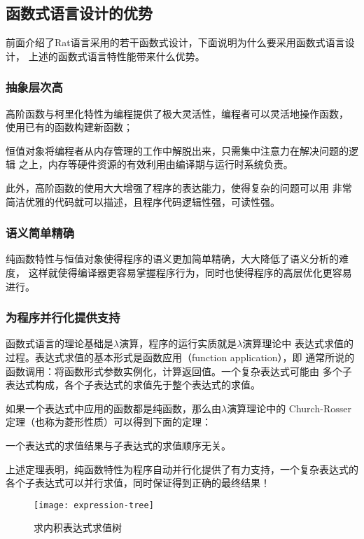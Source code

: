 \subsection{函数式语言设计的优势}\label{subsec:functional-advantages}
前面介绍了Rat语言采用的若干函数式设计，下面说明为什么要采用函数式语言设计，
上述的函数式语言特性能带来什么优势。

\subsubsection{抽象层次高}
高阶函数与柯里化特性为编程提供了极大灵活性，编程者可以灵活地操作函数，
使用已有的函数构建新函数；

恒值对象将编程者从内存管理的工作中解脱出来，只需集中注意力在解决问题的逻辑
之上，内存等硬件资源的有效利用由编译期与运行时系统负责。

此外，高阶函数的使用大大增强了程序的表达能力，使得复杂的问题可以用
非常简洁优雅的代码就可以描述，且程序代码逻辑性强，可读性强。

\subsubsection{语义简单精确}
纯函数特性与恒值对象使得程序的语义更加简单精确，大大降低了语义分析的难度，
这样就使得编译器更容易掌握程序行为，同时也使得程序的高层优化更容易进行。

\subsubsection{为程序并行化提供支持}
函数式语言的理论基础是$\lambda$演算，程序的运行实质就是$\lambda$演算理论中
表达式求值的过程。表达式求值的基本形式是函数应用（function application），即
通常所说的函数调用：将函数形式参数实例化，计算返回值。一个复杂表达式可能由
多个子表达式构成，各个子表达式的求值先于整个表达式的求值。

如果一个表达式中应用的函数都是纯函数，那么由$\lambda$演算理论中的
Church-Rosser定理（也称为菱形性质）可以得到下面的定理：
\begin{theorem}
  一个表达式的求值结果与子表达式的求值顺序无关。
\end{theorem}

上述定理表明，纯函数特性为程序自动并行化提供了有力支持，一个复杂表达式的
各个子表达式可以并行求值，同时保证得到正确的最终结果！

\begin{quotation}
\end{quotation}
\begin{figure}
  \centering
  \texttt{[image: expression-tree]}
  \caption{求内积表达式求值树}
  \label{fig:expression-tree}
\end{figure}

